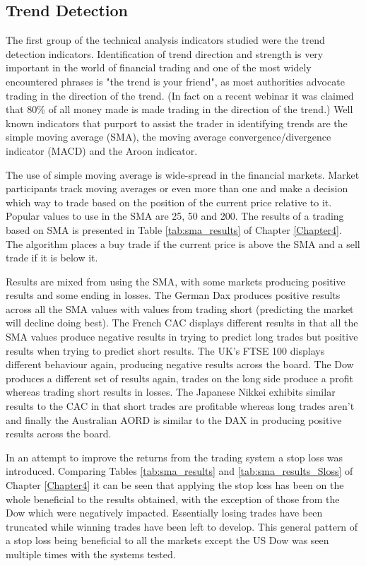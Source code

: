 \subsection{Trend Detection}
The first group of the technical analysis indicators studied were the trend detection indicators. Identification of trend direction and strength is very important in the world of financial trading and one of the most widely encountered phrases is "the trend is your friend", as most authorities advocate trading in the direction of the trend. (In fact on a recent webinar it was claimed that 80\% of all money made is made trading in the direction of the trend.)  Well known indicators that purport to assist the trader in identifying trends are the simple moving average (SMA), the moving average convergence/divergence indicator (MACD) and the Aroon indicator.

The use of simple moving average is wide-spread in the financial markets. Market participants track moving averages or even more than one and make a decision which way to trade based on the position of the current price relative to it. Popular values to use in the SMA are 25, 50 and 200. The results of a trading based on SMA is presented in Table \ref{tab:sma_results} of Chapter \ref{Chapter4}. The algorithm places a buy trade if the current price is above the SMA and a sell trade if it is below it. 

Results are mixed from using the SMA, with some markets producing positive results and some ending in losses. The German Dax produces positive results across all the SMA values with values from trading short (predicting the market will decline doing best).  The French CAC displays different results in that all the SMA values produce negative results in trying to  predict long trades but positive results when trying to predict short results.  The UK's FTSE 100 displays different behaviour again, producing negative results across the board. The Dow produces a different set of results again, trades on the long side produce a profit whereas trading short results in losses.  The Japanese Nikkei exhibits similar results to the CAC in that short trades are profitable whereas long trades aren't and finally the Australian AORD is similar to the DAX in producing positive results across the board. 


In an attempt to improve the returns from the trading system a stop loss was introduced. Comparing Tables \ref{tab:sma_results} and \ref{tab:sma_results_Sloss} of Chapter \ref{Chapter4}
it can be seen that applying the stop loss has been on the whole beneficial to the results obtained, with the exception of those from the Dow which were negatively impacted. Essentially losing trades have been truncated while winning trades have been left to develop. This general pattern of a stop loss being beneficial to all the markets except the US Dow was seen multiple times with the systems tested.

